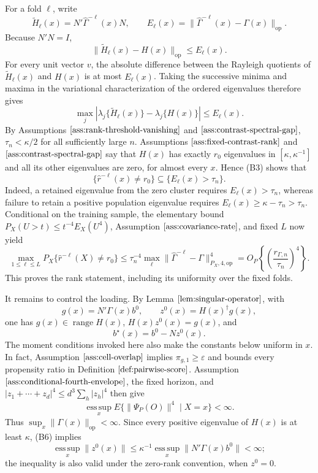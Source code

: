 For a fold \(\ell\), write
\[
 \widetilde H_\ell(x)=N'\widehat\Gamma^{-\ell}(x)N,
 \qquad
 E_\ell(x)=\|\widehat\Gamma^{-\ell}(x)-\Gamma(x)\|_{\mathrm{op}}.
 \tag{B1}
\]
Because \(N'N=I\),
\[
 \|\widetilde H_\ell(x)-H(x)\|_{\mathrm{op}}
 \le E_\ell(x).
 \tag{B2}
\]
For every unit vector \(v\), the absolute difference between the Rayleigh quotients of \(\widetilde H_\ell(x)\) and \(H(x)\) is at most \(E_\ell(x)\).  Taking the successive minima and maxima in the variational characterization of the ordered eigenvalues therefore gives
\[
 \max_j|\lambda_j\{\widetilde H_\ell(x)\}-\lambda_j\{H(x)\}|
 \le E_\ell(x).
 \tag{B3}
\]
By Assumptions \(\ref{ass:rank-threshold-vanishing}\) and \(\ref{ass:contrast-spectral-gap}\), \(\tau_n<\kappa/2\) for all sufficiently large \(n\).  Assumptions \(\ref{ass:fixed-contrast-rank}\) and \(\ref{ass:contrast-spectral-gap}\) say that \(H(x)\) has exactly \(r_0\) eigenvalues in \([\kappa,\kappa^{-1}]\) and all its other eigenvalues are zero, for almost every \(x\).  Hence (B3) shows that
\[
 \{\widehat r^{-\ell}(x)\ne r_0\}\subseteq\{E_\ell(x)>\tau_n\}.
 \tag{B4}
\]
Indeed, a retained eigenvalue from the zero cluster requires \(E_\ell(x)>\tau_n\), whereas failure to retain a positive population eigenvalue requires \(E_\ell(x)\ge\kappa-\tau_n>\tau_n\).  Conditional on the training sample, the elementary bound \(P_X(U>t)\le t^{-4}E_X(U^4)\), Assumption \(\ref{ass:covariance-rate}\), and fixed \(L\) now yield
\[
 \max_{1\le\ell\le L}P_X\{\widehat r^{-\ell}(X)\ne r_0\}
 \le \tau_n^{-4}\max_\ell\|\widehat\Gamma^{-\ell}-\Gamma\|_{P_X,4,\mathrm{op}}^4
 =O_P\!\left\{\left(\frac{r_{\Gamma,n}}{\tau_n}\right)^4\right\}.
 \tag{B5}
\]
This proves the rank statement, including its uniformity over the fixed folds.

It remains to control the loading.  By Lemma \(\ref{lem:singular-operator}\), with
\[
 g(x)=N'\Gamma(x)b^0,
 \qquad
 z^0(x)=H(x)^\dagger g(x),
 \tag{B6}
\]
one has \(g(x)\in\operatorname{range}H(x)\), \(H(x)z^0(x)=g(x)\), and
\[
 b^\star(x)=b^0-Nz^0(x).
 \tag{B7}
\]
The moment conditions invoked here also make the constants below uniform in \(x\).  In fact, Assumption \(\ref{ass:cell-overlap}\) implies \(\pi_{g,1}\ge\varepsilon\) and bounds every propensity ratio in Definition \(\ref{def:pairwise-score}\).  Assumption \(\ref{ass:conditional-fourth-envelope}\), the fixed horizon, and \(|z_1+\cdots+z_d|^4\le d^3\sum_h|z_h|^4\) then give
\[
 \operatorname*{ess\,sup}_{x}E\{\|\Psi_P(O)\|^4\mid X=x\}<\infty.
 \tag{B8}
\]
Thus \(\sup_x\|\Gamma(x)\|_{\mathrm{op}}<\infty\).  Since every positive eigenvalue of \(H(x)\) is at least \(\kappa\), (B6) implies
\[
 \operatorname*{ess\,sup}_{x}\|z^0(x)\|
 \le \kappa^{-1}\operatorname*{ess\,sup}_{x}\|N'\Gamma(x)b^0\|<\infty;
 \tag{B9}
\]
the inequality is also valid under the zero-rank convention, when \(z^0=0\).

